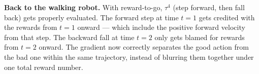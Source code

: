\medskip
\textbf{Back to the walking robot.} With reward-to-go, $\tau^4$ (step forward, then fall back)
gets properly evaluated. The forward step at time $t=1$ gets credited with the rewards from
$t=1$ onward --- which include the positive forward velocity from that step. The backward fall
at time $t=2$ only gets blamed for rewards from $t=2$ onward. The gradient now correctly
separates the good action from the bad one within the same trajectory, instead of blurring
them together under one total reward number.